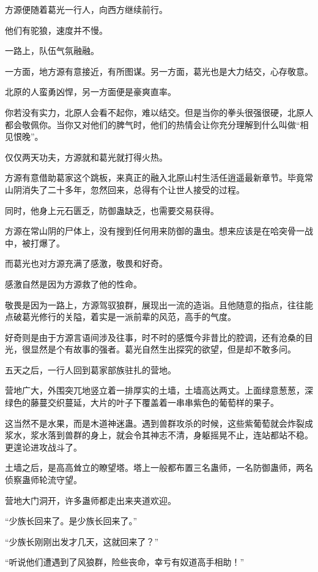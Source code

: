 
\begin{this_body}

方源便随着葛光一行人，向西方继续前行。

他们有驼狼，速度并不慢。

一路上，队伍气氛融融。

一方面，地方源有意接近，有所图谋。另一方面，葛光也是大力结交，心存敬意。

北原的人蛮勇凶悍，另一方面便是豪爽直率。

你若没有实力，北原人会看不起你，难以结交。但是当你的拳头很强很硬，北原人都会敬佩你。当你又对他们的脾气时，他们的热情会让你充分理解到什么叫做“相见恨晚”。

仅仅两天功夫，方源就和葛光就打得火热。

方源有意借助葛家这个跳板，来真正的融入北原山村生活任逍遥最新章节。毕竟常山阴消失了二十多年，忽然回来，总得有个让世人接受的过程。

同时，他身上元石匮乏，防御蛊缺乏，也需要交易获得。

方源在常山阴的尸体上，没有搜到任何用来防御的蛊虫。想来应该是在哈突骨一战中，被打爆了。

而葛光也对方源充满了感激，敬畏和好奇。

感激自然是因为方源救了他的性命。

敬畏是因为一路上，方源驾驭狼群，展现出一流的造诣。且他随意的指点，往往能点破葛光修行的关隘，着实是一派前辈的风范，高手的气度。

好奇则是由于方源言语间涉及往事，时不时的感慨今非昔比的腔调，还有沧桑的目光，很显然是个有故事的强者。葛光自然生出探究的欲望，但是却不敢多问。

五天之后，一行人回到葛家部族驻扎的营地。

营地广大，外围突兀地竖立着一排厚实的土墙，土墙高达两丈。上面绿意葱葱，深绿色的藤蔓交织蔓延，大片的叶子下覆盖着一串串紫色的葡萄样的果子。

这当然不是水果，而是木道神迷蛊。遇到兽群攻杀的时候，这些紫葡萄就会炸裂成浆水，浆水落到兽群的身上，就会令其神志不清，身躯摇晃不止，连站都站不稳。更遑论进攻战斗了。

土墙之后，是高高耸立的瞭望塔。塔上一般都布置三名蛊师，一名防御蛊师，两名侦察蛊师轮流守望。

营地大门洞开，许多蛊师都走出来夹道欢迎。

“少族长回来了。是少族长回来了。”

“少族长刚刚出发才几天，这就回来了？”

“听说他们遭遇到了风狼群，险些丧命，幸亏有奴道高手相助！”


\end{this_body}
